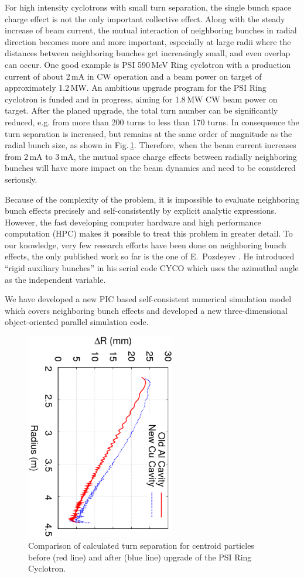 \documentclass{JAC2003}
\begin{document}
For high intensity cyclotrons with small turn separation, the single bunch space charge effect is not the only important collective effect.  
Along with the steady increase of beam current, the mutual interaction of neighboring bunches in radial direction 
becomes more and more important, especially at large radii where the distances between neighboring bunches get increasingly small, and even overlap can occur.
One good example is PSI 590\,MeV Ring cyclotron \cite{Mike:1} with a production current of about 2\,mA in CW operation and a beam power on target of approximately 1.2\,MW.
An ambitious upgrade program for the PSI Ring cyclotron is funded and in progress, aiming for 1.8\,MW CW beam power on target. 
After the planed upgrade, the total turn number can be significantly reduced, e.g. from more than 200 turns to less than 
170 turns.
In consequence the turn separation is increased, but remains at the same order of magnitude as the radial bunch size, as shown in Fig.\,\ref{fig:TuneSep}.
Therefore, when the beam current increases from 2\,mA to 3\,mA, 
the mutual space charge effects between radially neighboring bunches will have more impact on the beam dynamics and need to be considered seriously.

Because of the complexity of the problem, it is impossible to evaluate neighboring bunch effects precisely and self-consistently by explicit 
analytic expressions. However, the fast developing computer hardware and high performance computation (HPC) makes it possible to 
treat this problem in greater detail. To our knowledge, very few research efforts have been done on neighboring bunch effects, the only published work so far is the one of   
E.\ Pozdeyev \cite{Poz:1}. He introduced ``rigid auxiliary bunches'' in his serial code CYCO which uses the azimuthal angle as the independent variable.

We have developed a new PIC based self-consistent numerical simulation model which covers neighboring bunch effects 
and developed a new three-dimensional object-oriented parallel simulation code.  

\begin{figure}
  \centering \includegraphics[width=65mm, angle=90]{figures/R_dR_Ring.ps}
  \caption{Comparison of calculated turn separation for centroid particles before (red line) and after (blue line) upgrade of the PSI Ring Cyclotron.}
  \label{fig:TuneSep}
\end{figure}
\end{document}
